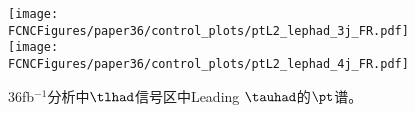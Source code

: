
\begin{figure}[H]
\centering
\texttt{[image: \\FCNCFigures/paper36/control\_plots/ptL2\_lephad\_3j\_FR.pdf]}
\texttt{[image: \\FCNCFigures/paper36/control\_plots/ptL2\_lephad\_4j\_FR.pdf]}
\caption{36fb$^{-1}$分析中$\tlhad$信号区中Leading $\tauhad$的$\pt$谱。}
\label{fig:Modelling36lh}
\end{figure}